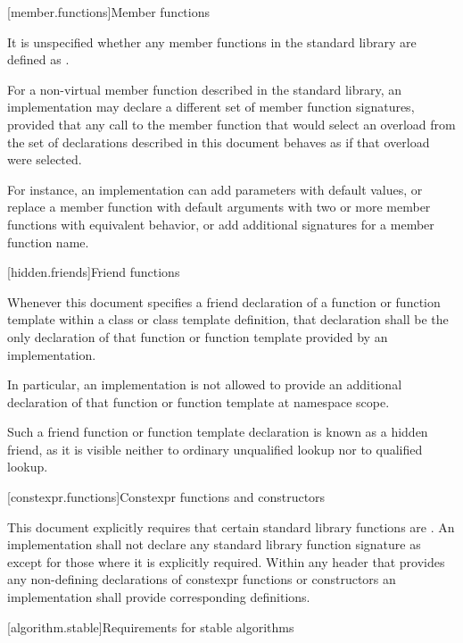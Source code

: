 [member.functions]{Member functions}

\pnum
It is unspecified whether any member functions in the \Cpp{} standard library are defined as
.

\pnum
For a non-virtual member function described in the \Cpp{} standard library,
an implementation may declare a different set of member function signatures,
provided that any call to the member function that would select
an overload from the set of declarations described in this document
behaves as if that overload were selected.
\begin{note}
For instance, an implementation can add parameters with default values,
or replace a member function with default arguments
with two or more member functions with equivalent behavior,
or add additional signatures for a member function name.
\end{note}

[hidden.friends]{Friend functions}

\pnum
Whenever this document specifies
a friend declaration of a function or function template
within a class or class template definition,
that declaration shall be
the only declaration of that function or function template
provided by an implementation.
\begin{note}
In particular,
an implementation is not allowed to provide
an additional declaration of that function or function template
at namespace scope.
\end{note}
\begin{note}
Such a friend function or function template declaration
is known as a hidden friend,
as it is visible neither
to ordinary unqualified lookup nor
to qualified lookup.
\end{note}

[constexpr.functions]{Constexpr functions and constructors}

\pnum
This document explicitly requires that certain standard library functions are
. An implementation shall not declare
any standard library function signature as  except for those where
it is explicitly required.
Within any header that provides any non-defining declarations of constexpr
functions or constructors an implementation shall provide corresponding definitions.

[algorithm.stable]{Requirements for stable algorithms}

